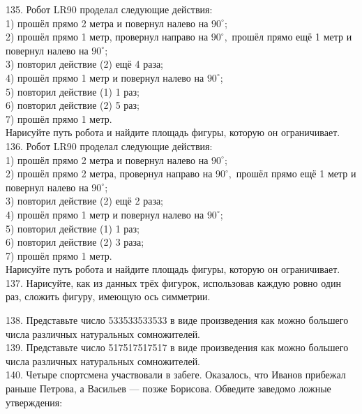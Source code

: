 135. Робот LR90 проделал следующие действия:\\
1) прошёл прямо 2 метра и повернул налево на $90^\circ$;\\
2) прошёл прямо 1 метр, провернул направо на $90^\circ,$ прошёл прямо ещё 1 метр и повернул налево на $90^\circ$;\\
3) повторил действие (2) ещё 4 раза;\\
4) прошёл прямо 1 метр и повернул налево на $90^\circ$;\\
5) повторил действие (1) 1 раз;\\
6) повторил действие (2) 5 раз;\\
7) прошёл прямо 1 метр.\\
Нарисуйте путь робота и найдите площадь фигуры, которую он ограничивает.\\
136. Робот LR90 проделал следующие действия:\\
1) прошёл прямо 2 метра и повернул налево на $90^\circ$;\\
2) прошёл прямо 2 метра, провернул направо на $90^\circ,$ прошёл прямо ещё 1 метр и повернул налево на $90^\circ$;\\
3) повторил действие (2) ещё 2 раза;\\
4) прошёл прямо 1 метр и повернул налево на $90^\circ$;\\
5) повторил действие (1) 1 раз;\\
6) повторил действие (2) 3 раза;\\
7) прошёл прямо 1 метр.\\
Нарисуйте путь робота и найдите площадь фигуры, которую он ограничивает.\\
137. Нарисуйте, как из данных трёх фигурок, использовав каждую ровно один раз, сложить фигуру, имеющую ось симметрии.
\begin{center}
\begin{figure}[ht!]
\end{figure}
\end{center}
138. Представьте число 533533533533 в виде произведения как можно большего числа различных натуральных сомножителей.\\
139. Представьте число 517517517517 в виде произведения как можно большего числа различных натуральных сомножителей.\\
140. Четыре спортсмена участвовали в забеге. Оказалось, что Иванов прибежал раньше Петрова, а Васильев --- позже Борисова. Обведите заведомо ложные утверждения:\\
